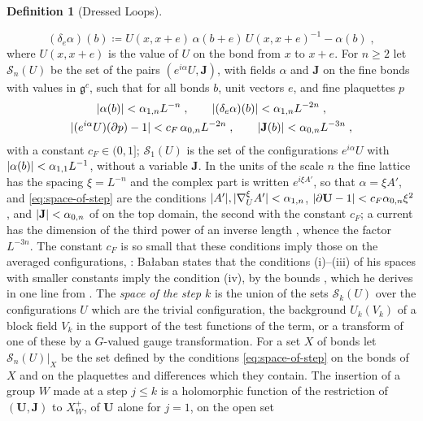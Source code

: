 \documentclass[11pt]{preprint}
\DeclarePairedDelimiter{\abs}{\lvert}{\rvert}
\numberwithin{equation}{section}
\theoremstyle{definition}
\newtheorem{definition}[theorem]{Definition}
\theoremstyle{remark}
\theoremstyle{plain}
\begin{document}
\begin{definition}[Dressed Loops]
\begin{enumerate}[label=(\roman*)]
\begin{equation}\label{eq:covariant-difference}
    (\delta_e\alpha)(b) \coloneqq U(x, x + e)\,\alpha(b + e)\,U(x, x + e)^{-1} - \alpha(b)\;,
\end{equation}
where $U(x, x + e)$ is the value of $U$ on the bond from $x$ to $x + e$. For $n \geq 2$ let $\mathcal S_n(U)$ be the set of the pairs $(e^{i\alpha}U, \mathbf J)$, with fields $\alpha$ and $\mathbf J$ on the fine bonds with values in $\mathfrak g^c$, such that for all bonds $b$, unit vectors $e$, and fine plaquettes $p$
\begin{equation}\label{eq:space-of-step}
\begin{gathered}
    \abs{\alpha(b)} < \alpha_{1,n}L^{-n}\;,
    \qquad
    \abs{(\delta_e\alpha)(b)} < \alpha_{1,n}L^{-2n}\;,\\
    \abs{(e^{i\alpha}U)(\partial p) - 1} < c_F\,\alpha_{0,n}L^{-2n}\;,
    \qquad
    \abs{\mathbf J(b)} < \alpha_{0,n}L^{-3n}\;,
\end{gathered}
\end{equation}
with a constant $c_F \in (0, 1]$; $\mathcal S_1(U)$ is the set of the configurations $e^{i\alpha}U$ with $\abs{\alpha(b)} < \alpha_{1,1}L^{-1}$, without a variable $\mathbf J$. In the units of the scale $n$ the fine lattice has the spacing $\xi = L^{-n}$ and the complex part is written $e^{i\xi A'}$, so that $\alpha = \xi A'$, and \eqref{eq:space-of-step} are the conditions $\abs{A'}, \abs{\nabla^\xi_UA'} < \alpha_{1,n}$, $\abs{\partial\mathbf U - 1} < c_F\alpha_{0,n}\xi^2$, and $\abs{\mathbf J} < \alpha_{0,n}$ of \cite[(2.39), (2.34), (2.36), p.~261]{BalabanCRE} on the top domain, the second with the constant $c_F$; a current has the dimension of the third power of an inverse length \cite[(1.8), p.~261]{BalabanRG1}, whence the factor $L^{-3n}$. The constant $c_F$ is so small that these conditions imply those on the averaged configurations, \cite[(2.35), (2.37)]{BalabanCRE}: Ba{\l}aban states that the conditions (i)--(iii) of his spaces with smaller constants imply the condition (iv), by the bounds \cite[(1.17), p.~263]{BalabanRG1}, which he derives in one line from \cite[Proposition~9]{BalabanVAR}. The \emph{space of the step $k$} is the union of the sets $\mathcal S_k(U)$ over the configurations $U$ which are the trivial configuration, the background $U_k(V_k)$ of a block field $V_k$ in the support of the test functions of the term, or a transform of one of these by a $G$-valued gauge transformation. For a set $X$ of bonds let $\mathcal S_n(U)|_X$ be the set defined by the conditions \eqref{eq:space-of-step} on the bonds of $X$ and on the plaquettes and differences which they contain. The insertion of a group $W$ made at a step $j \leq k$ is a holomorphic function of the restriction of $(\mathbf U, \mathbf J)$ to $X^+_W$, of $\mathbf U$ alone for $j = 1$, on the open set

\end{enumerate}
\end{definition}
\end{document}
